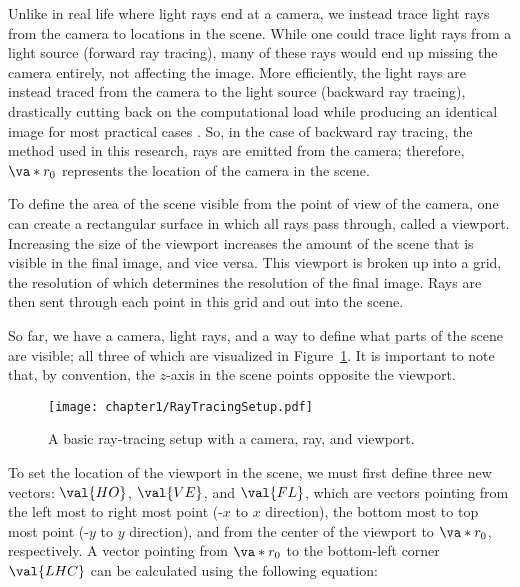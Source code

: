 \par Unlike in real life where light rays end at a camera, we instead trace light rays from the camera to locations in the scene. While one could trace light rays from a light source (forward ray tracing), many of these rays would end up missing the camera entirely, not affecting the image. More efficiently, the light rays are instead traced from the camera to the light source (backward ray tracing), drastically cutting back on the computational load while producing an identical image for most practical cases \cite{Peddie}. So, in the case of backward ray tracing, the method used in this research, rays are emitted from the camera; therefore, $\va*{r_0}$ represents the location of the camera in the scene.

\par To define the area of the scene visible from the point of view of the camera, one can create a rectangular surface in which all rays pass through, called a viewport. Increasing the size of the viewport increases the amount of the scene that is visible in the final image, and vice versa. This viewport is broken up into a grid, the resolution of which determines the resolution of the final image. Rays are then sent through each point in this grid and out into the scene.

\par So far, we have a camera, light rays, and a way to define what parts of the scene are visible; all three of which are visualized in Figure~\ref{fig:basic_ray_tracing_setup}. It is important to note that, by convention, the $z$-axis in the scene points opposite the viewport.

\begin{figure}[H]
  \centering
\texttt{[image: chapter1/RayTracingSetup.pdf]}
\caption{A basic ray-tracing setup with a camera, ray, and viewport.}
\label{fig:basic_ray_tracing_setup}
\end{figure}

\par To set the location of the viewport in the scene, we must first define three new vectors: $\val{HO}$, $\val{VE}$, and $\val{FL}$, which are vectors pointing from the left most to right most point (-$x$ to $x$ direction), the bottom most to top most point (-$y$ to $y$ direction), and from the center of the viewport to $\va*{r_0}$, respectively. A vector pointing from $\va*{r_0}$ to the bottom-left corner $\val{LHC}$ can be calculated using the following equation:


